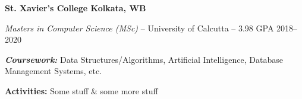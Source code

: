 \textbf{St. Xavier's College \hfill Kolkata, WB} \par
\textit{Masters in Computer Science (MSc)} -- University of Calcutta -- 3.98 GPA \hfill 2018--2020\par
\textbf{\textit{Coursework:}} Data Structures/Algorithms, Artificial Intelligence, Database Management Systems, etc.\par
\textbf{\textit{}{Activities:}} Some stuff & some more stuff